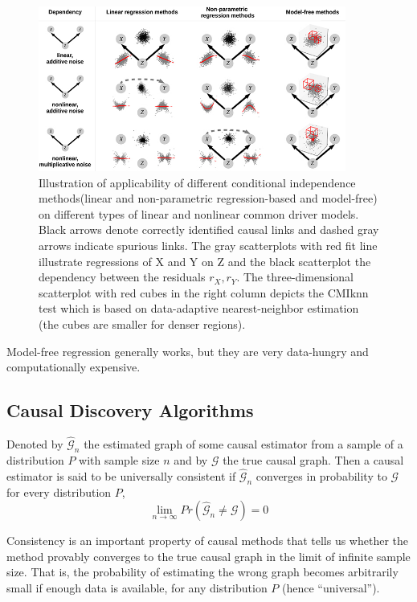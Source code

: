 \begin{figure}[H]
    \includegraphics[width=0.9\textwidth]{img/depfunc.jpeg}
    \centering
    \caption{Illustration of applicability of different conditional independence methods(linear and non-parametric
    regression-based and model-free) on different types of linear and nonlinear common driver models. Black arrows 
    denote correctly identified causal links and dashed gray arrows indicate spurious links. The gray scatterplots 
    with red fit line illustrate regressions of X and Y on Z and the black scatterplot the dependency between the 
    residuals $r_X,r_Y$. The three-dimensional scatterplot with red cubes in the right column depicts the CMIknn test 
    which is based on data-adaptive nearest-neighbor estimation (the cubes are smaller for denser regions).}
\end{figure}

Model-free regression generally works, but they are very data-hungry and computationally expensive.

\subsection{Causal Discovery Algorithms}
\begin{tcolorbox}[colback=red!5!white,colframe=red!75!black,title=\textbf{Universal causal consistency Definition}]
Denoted by $\mathcal{\hat{G}}_n$ the estimated graph of some causal estimator from a sample of a 
distribution $P$ with sample size $n$ and by $\mathcal{G}$ the true causal graph. 
Then a causal estimator is said to be universally consistent if $\hat{\mathcal{G}}_n$ 
converges in probability to $\mathcal{G}$ for every distribution $P$,
\begin{equation*}
    \lim_{n\rightarrow\infty} Pr(\hat{\mathcal{G}}_n\ne\mathcal{G})=0
\end{equation*}
\end{tcolorbox}
Consistency is an important property of causal methods that tells us whether the method provably 
converges to the true causal graph in the limit of infinite sample size. That is, the probability of estimating 
the wrong graph becomes arbitrarily small if enough data is available, for any distribution $P$ (hence “universal”).

